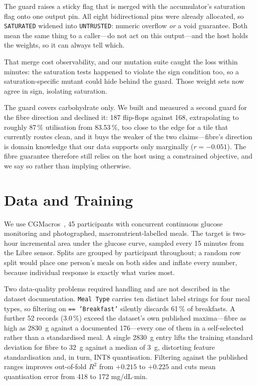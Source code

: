 \documentclass[conference]{IEEEtran}
\begin{document}
The guard raises a sticky flag that is merged with the accumulator's saturation
flag onto one output pin. All eight bidirectional pins were already allocated,
so \texttt{SATURATED} widened into \texttt{UNTRUSTED}: numeric overflow
\emph{or} a void guarantee. Both mean the same thing to a caller---do not act on
this output---and the host holds the weights, so it can always tell which.

That merge cost observability, and our mutation suite caught the loss within
minutes: the saturation tests happened to violate the sign condition too, so a
saturation-specific mutant could hide behind the guard. Those weight sets now
agree in sign, isolating saturation.

The guard covers carbohydrate only. We built and measured a second guard for
the fibre direction and declined it: 187 flip-flops against 168, extrapolating
to roughly 87\,\% utilisation from 83.53\,\%, too close to the edge for a tile
that currently routes clean, and it buys the weaker of the two claims---fibre's
direction is domain knowledge that our data supports only marginally
($r=-0.051$). The fibre guarantee therefore still relies on the host using a
constrained objective, and we say so rather than implying otherwise.

\section{Data and Training}

We use CGMacros~\cite{cgmacros}, 45 participants with concurrent continuous
glucose monitoring and photographed, macronutrient-labelled meals. The target
is two-hour incremental area under the glucose curve, sampled every 15 minutes
from the Libre sensor. Splits are grouped by participant throughout; a random
row split would place one person's meals on both sides and inflate every
number, because individual response is exactly what varies most.

Two data-quality problems required handling and are not described in the
dataset documentation. \texttt{Meal Type} carries ten distinct label strings
for four meal types, so filtering on \texttt{== 'Breakfast'} silently discards
61\,\% of breakfasts. A further 52 records (3.0\,\%) exceed the dataset's own
published maxima---fibre as high as 2830~g against a documented 176---every one
of them in a self-selected rather than a standardised meal. A single 2830~g
entry lifts the training standard deviation for fibre to 32~g against a median
of 3~g, distorting feature standardisation and, in turn, INT8 quantisation.
Filtering against the published ranges improves out-of-fold $R^2$ from $+0.215$
to $+0.225$ and cuts mean quantisation error from 418 to 172 mg/dL$\cdot$min.
\end{document}
